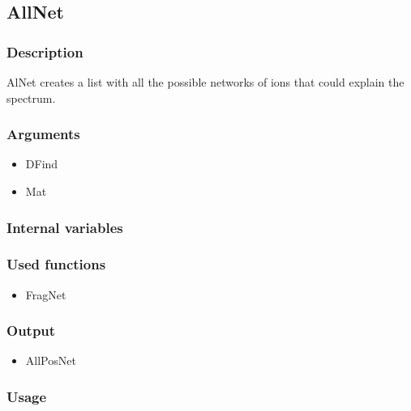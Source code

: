 \subsection{AllNet}
\subsubsection{Description}
AlNet creates a list with all the possible networks of ions that could explain the spectrum.
\subsubsection{Arguments}
\begin{itemize}
\item DFind
\item Mat
\end{itemize}
\subsubsection{Internal variables}
\subsubsection{Used functions}
\begin{itemize}
\item FragNet
\end{itemize}
\subsubsection{Output}
\begin{itemize}
\item AllPosNet
\end{itemize}
\subsubsection{Usage}




